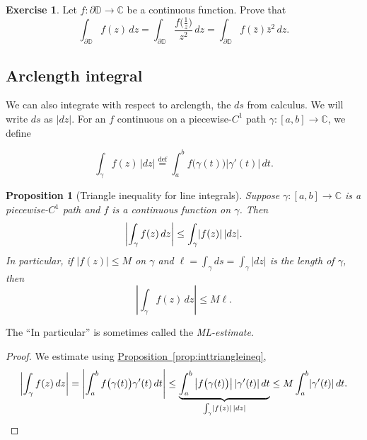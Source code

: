 \documentclass[12pt,openany]{book}
\newcommand{\glsadd}[2][]{}
\newcommand{\avoidbreak}{\postdisplaypenalty=100}
\newcommand{\sabs}[1]{\lvert {#1} \rvert}
\newcommand{\abs}[1]{\left\lvert {#1} \right\rvert}
\newcommand{\C}{{\mathbb{C}}}
\newcommand{\D}{{\mathbb{D}}}
\newcommand{\myindex}[1]{#1\index{#1}}
\newcommand{\myquote}[1]{``#1''}
\theoremstyle{plain}
\newtheorem{prop}[thm]{Proposition}
\theoremstyle{remark}
\theoremstyle{definition}
\newenvironment{exbox}{%
    \def\FrameCommand{\vrule width 1pt \relax\hspace{10pt}}%
    \MakeFramed{\advance\hsize-\width\FrameRestore}%
}{%
    \endMakeFramed
}
\theoremstyle{exercise}
\newtheorem{exercise}{Exercise}[section]
\theoremstyle{example}
\newcommand{\propref}[1]{\hyperref[#1]{Proposition~\ref*{#1}}}
\begin{document}
\begin{exbox}
\begin{exercise}
Let $f \colon \partial \D \to \C$ be a continuous function.  Prove that
\begin{equation*}
\int_{\partial \D} f(z) \, dz
=
\int_{\partial \D} \frac{f\bigl(\frac{1}{z}\bigr)}{z^2} \, dz
=
\int_{\partial \D} f(\bar{z}) \bar{z}^2 \, dz .
\end{equation*}
\end{exercise}
\end{exbox}

\subsection{Arclength integral}

We can also integrate with respect to arclength, the $ds$ from calculus.
We will write $ds$ as $\sabs{dz}$.  For an $f$ continuous on
a piecewise-$C^1$ path $\gamma \colon [a,b] \to \C$,
we define
\glsadd{not:arclength}
\begin{equation*}
\int_\gamma f(z) \, \sabs{dz}
\overset{\text{def}}{=}
\int_a^b f\bigl( \gamma(t) \bigr) \sabs{\gamma'(t)} \, dt .
\end{equation*}


\begin{prop}[Triangle inequality for line integrals]%
%
\label{prop:mlineq}%
Suppose $\gamma \colon [a,b] \to \C$ is 
a piecewise-$C^1$ path and $f$ is a continuous function on
$\gamma$.  Then
\begin{equation*}
\abs{\int_\gamma f(z) \, dz} \leq \int_\gamma \sabs{f(z)} \, \sabs{dz} .
\avoidbreak
\end{equation*}
In particular, if $\sabs{f(z)} \leq M$ on $\gamma$ and $\ell = \int_\gamma ds
= \int_{\gamma} \sabs{dz}$ is the length of $\gamma$, then
\begin{equation*}
\abs{\int_\gamma f(z) \, dz} \leq M \ell .
\end{equation*}
\end{prop} 

The \myquote{In particular} is sometimes called the
\emph{\myindex{ML-estimate}}.

\begin{proof}
We estimate using \propref{prop:inttriangleineq},
\begin{equation*}
\abs{\int_\gamma f(z) \, dz}
=
\abs{\int_a^b f\bigl( \gamma(t) \bigr) \gamma'(t) \, dt}
\leq
\underbrace{\int_a^b \abs{ f\bigl( \gamma(t) \bigr) }  \sabs{ \gamma'(t) }
\, dt}_{\int_\gamma \sabs{f(z)} \, \sabs{dz}}
\leq
M
\int_a^b \sabs{ \gamma'(t) } \, dt .
\qedhere
\end{equation*}
\end{proof}
\end{document}
